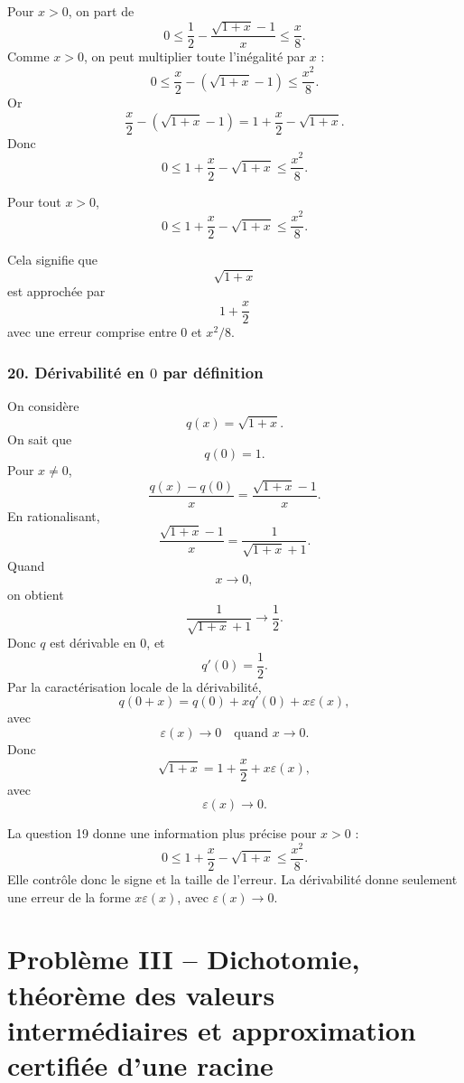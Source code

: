 \documentclass[11pt,a4paper]{article}
\newcommand{\eps}{\varepsilon}
\begin{document}
Pour \(x>0\), on part de
\[
0\leq \frac12-\frac{\sqrt{1+x}-1}{x}\leq \frac{x}{8}.
\]
Comme \(x>0\), on peut multiplier toute l'inégalité par \(x\) :
\[
0\leq \frac{x}{2}-(\sqrt{1+x}-1)\leq \frac{x^2}{8}.
\]
Or
\[
\frac{x}{2}-(\sqrt{1+x}-1)
=
1+\frac{x}{2}-\sqrt{1+x}.
\]
Donc
\[
0\leq 1+\frac{x}{2}-\sqrt{1+x}\leq \frac{x^2}{8}.
\]

\begin{resultatbox}
Pour tout \(x>0\),
\[
0\leq 1+\frac{x}{2}-\sqrt{1+x}\leq \frac{x^2}{8}.
\]
\end{resultatbox}

Cela signifie que
\[
\sqrt{1+x}
\]
est approchée par
\[
1+\frac{x}{2}
\]
avec une erreur comprise entre \(0\) et \(x^2/8\).


\subsubsection*{20. Dérivabilité en \(0\) par définition}

On considère
\[
q(x)=\sqrt{1+x}.
\]
On sait que
\[
q(0)=1.
\]
Pour \(x\neq0\),
\[
\frac{q(x)-q(0)}{x}
=
\frac{\sqrt{1+x}-1}{x}.
\]
En rationalisant,
\[
\frac{\sqrt{1+x}-1}{x}
=
\frac1{\sqrt{1+x}+1}.
\]
Quand
\[
x\to0,
\]
on obtient
\[
\frac1{\sqrt{1+x}+1}\to\frac12.
\]
Donc \(q\) est dérivable en \(0\), et
\[
q'(0)=\frac12.
\]
Par la caractérisation locale de la dérivabilité,
\[
q(0+x)=q(0)+xq'(0)+x\eps(x),
\]
avec
\[
\eps(x)\to0
\quad\text{quand }x\to0.
\]
Donc
\[
\sqrt{1+x}=1+\frac{x}{2}+x\eps(x),
\]
avec
\[
\eps(x)\to0.
\]

\begin{remarquebox}
La question 19 donne une information plus précise pour \(x>0\) :
\[
0\leq 1+\frac{x}{2}-\sqrt{1+x}\leq\frac{x^2}{8}.
\]
Elle contrôle donc le signe et la taille de l'erreur.  
La dérivabilité donne seulement une erreur de la forme \(x\eps(x)\), avec \(\eps(x)\to0\).
\end{remarquebox}

\newpage


\section*{Problème III -- Dichotomie, théorème des valeurs intermédiaires et approximation certifiée d'une racine}
\end{document}
